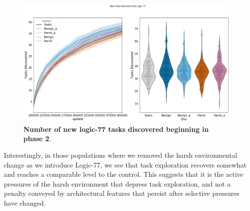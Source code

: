 \documentclass[PhD]{msu-thesis}
\begin{document}
	\begin{figure}[!h]
	\includegraphics[trim={0 0 0 0}, clip, width=0.75\columnwidth]{figures/LTE/lte-simple-post_reward_task_discovery.png}
	\caption{\textbf{Number of new logic-77 tasks discovered beginning in phase 2}.%
	}
	\label{fig:postreward_task_discovery}
	\end{figure} 

Interestingly, in those populations where we removed the harsh environmental change as we introduce Logic-77, we see that task exploration recovers somewhat and reaches a comparable level to the control. This suggests that it is the active pressures of the harsh environment that depress task exploration, and not a penalty conveyed by architectural features that persist after selective pressures have changed.
\end{document}

